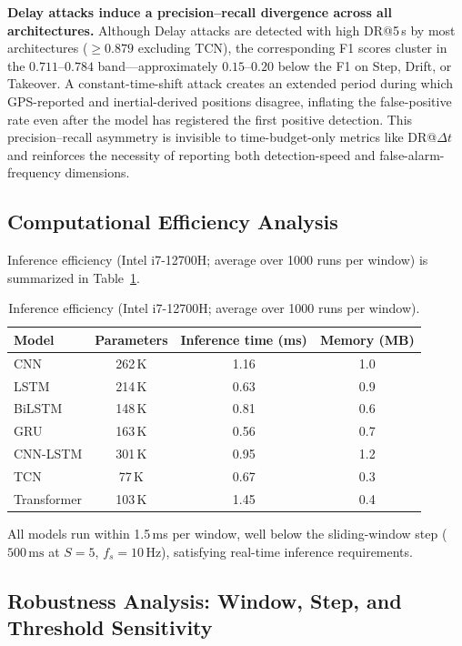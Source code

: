\documentclass{ieeeaccess}
\begin{document}
\textbf{Delay attacks induce a precision--recall divergence across all
architectures.}
Although Delay attacks are detected with high DR@5\,s by most architectures
($\ge 0.879$ excluding TCN), the corresponding F1 scores cluster in the
$0.711$--$0.784$ band---approximately $0.15$--$0.20$ below the F1 on Step,
Drift, or Takeover.
A constant-time-shift attack creates an extended period during which
GPS-reported and inertial-derived positions disagree, inflating the
false-positive rate even after the model has registered the first
positive detection.
This precision--recall asymmetry is invisible to time-budget-only
metrics like DR@$\Delta t$ and reinforces the necessity of reporting
both detection-speed and false-alarm-frequency dimensions.

\subsection{Computational Efficiency Analysis}

Inference efficiency (Intel i7-12700H; average over 1000 runs per window) is summarized in Table~\ref{tab:inference-eff}.

\begin{table}[!t]
\caption{Inference efficiency (Intel i7-12700H; average over 1000 runs per window).}
\label{tab:inference-eff}
\centering
\begin{tabular}{lccc}
\hline
\textbf{Model} & \textbf{Parameters} & \textbf{Inference time (ms)} & \textbf{Memory (MB)} \\
\hline
CNN & 262\,K & 1.16 & 1.0 \\
LSTM & 214\,K & 0.63 & 0.9 \\
BiLSTM & 148\,K & 0.81 & 0.6 \\
GRU & 163\,K & 0.56 & 0.7 \\
CNN-LSTM & 301\,K & 0.95 & 1.2 \\
TCN & 77\,K & 0.67 & 0.3 \\
Transformer & 103\,K & 1.45 & 0.4 \\
\hline
\end{tabular}
\end{table}

All models run within 1.5\,ms per window, well below the sliding-window step ($500\,\mathrm{ms}$ at $S=5$, $f_s=10$\,Hz), satisfying real-time inference requirements.

\subsection{Robustness Analysis: Window, Step, and Threshold Sensitivity}
\label{sec:ablation}
\end{document}
